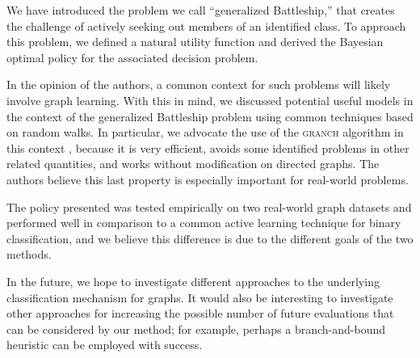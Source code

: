 \documentclass{acm_proc_article-sp}
\begin{document}
We have introduced the problem we call ``generalized Battleship,''
that creates the challenge of actively seeking out members of an
identified class.  To approach this problem, we defined a natural
utility function and derived the Bayesian optimal policy for the
associated decision problem.

In the opinion of the authors, a common context for such problems will
likely involve graph learning.  With this in mind, we discussed
potential useful models in the context of the generalized Battleship
problem using common techniques based on random walks.  In particular,
we advocate the use of the \textsc{granch} algorithm in this context
\citep{granch, granchfast}, because it is very efficient, avoids some
identified problems in other related quantities, and works without
modification on directed graphs.  The authors believe this last
property is especially important for real-world problems.

The policy presented was tested empirically on two real-world graph
datasets and performed well in comparison to a common active learning
technique for binary classification, and we believe this difference is
due to the different goals of the two methods.

In the future, we hope to investigate different approaches to the
underlying classification mechanism for graphs.  It would also be
interesting to investigate other approaches for increasing the
possible number of future evaluations that can be considered by
our method; for example, perhaps a branch-and-bound heuristic can 
be employed with success.

\balancecolumns



\end{document}
